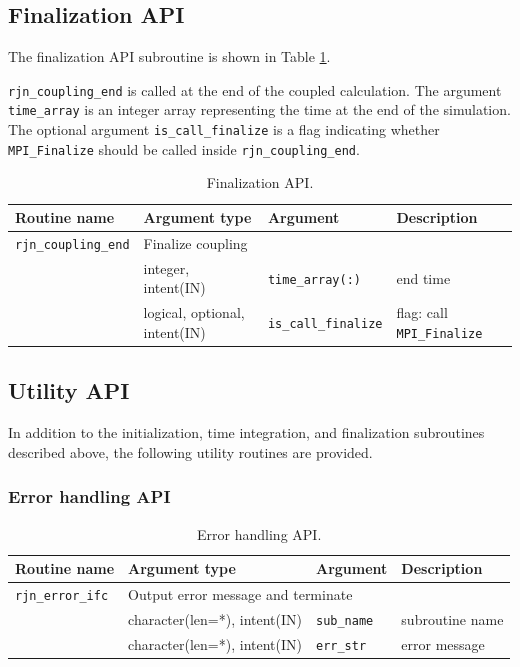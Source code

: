 \documentclass[11pt,a4paper]{report}
\newcommand{\tabref}[1]{Table \ref{#1}}
\begin{document}
\subsection{Finalization API}

The finalization API subroutine
is shown in \tabref{table:rjn_api_finalize}.

\texttt{rjn\_coupling\_end} is called
at the end of the coupled calculation.
The argument \texttt{time\_array} is an integer array
representing the time at the end of the simulation.
The optional argument \texttt{is\_call\_finalize} is a flag
indicating whether \texttt{MPI\_Finalize}
should be called inside \texttt{rjn\_coupling\_end}.

\begin{table}[H]
\begin{center}
\caption{Finalization API.}
{\small
\label{table:rjn_api_finalize}
\begin{tabular}{llll}
\hline\hline
Routine name & Argument type & Argument & Description \\
\hline
 \texttt{rjn\_coupling\_end} & \multicolumn{3}{l}{Finalize coupling}\\
           &  integer, intent(IN) &  \texttt{time\_array(:)}
             & end time\\
           &  logical, optional, intent(IN) &  \texttt{is\_call\_finalize}
             & flag: call \texttt{MPI\_Finalize}\\
\hline\hline
\end{tabular}
}
\end{center}
\end{table}


\subsection{Utility API}

In addition to the initialization, time integration,
and finalization subroutines described above,
the following utility routines are provided.

\subsubsection{Error handling API}

\begin{table}[H]
\begin{center}
\caption{Error handling API.}
{\small
\label{table:rjn_api_error}
\begin{tabular}{llll}
\hline\hline
Routine name & Argument type & Argument & Description \\
\hline
 \texttt{rjn\_error\_ifc} & \multicolumn{3}{l}{Output error message and terminate}\\
           &  character(len=*), intent(IN) &  \texttt{sub\_name} & subroutine name\\
           &  character(len=*), intent(IN) &  \texttt{err\_str} & error message\\
\hline\hline
\end{tabular}
}
\end{center}
\end{table}
\end{document}
